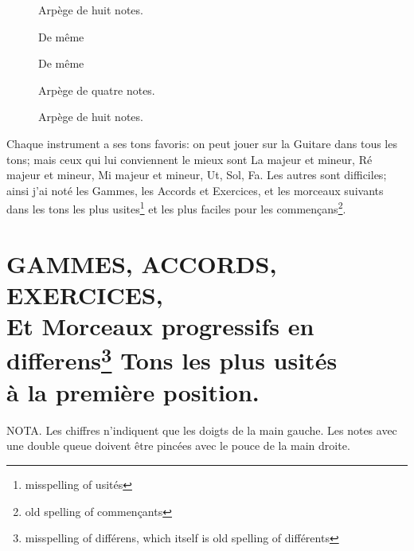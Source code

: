 \documentclass[a4paper]{book}
\begin{document}
\begin{figure}[H]
  \centering
  \begin{minipage}{1.8in}
    \caption{Arpège de huit notes.}
  \end{minipage}
  \hfill
  \begin{minipage}{1.9in}
    \caption{De même}
  \end{minipage}
  \hfill
  \begin{minipage}{2.1in}
    \caption{De même}
  \end{minipage}
\end{figure}

\begin{figure}[H]
  \centering
  \hfill
  \begin{minipage}{1.9in}
    \caption{Arpège de quatre notes.}
  \end{minipage}
  \hfill
  \begin{minipage}{2.1in}
    \caption{Arpège de huit notes.}
  \end{minipage}
  \hfill{}
\end{figure}

Chaque instrument a ses tons favoris: on peut jouer sur la Guitare dans tous les tons; mais ceux qui lui conviennent le mieux sont La majeur et mineur, Ré majeur et mineur, Mi majeur et mineur, Ut, Sol, Fa.  Les autres sont difficiles; ainsi j'ai noté les Gammes, les Accords et Exercices, et les morceaux suivants dans les tons les plus usites\footnote{misspelling of usités} et les plus faciles pour les commençans\footnote{old spelling of commençants}.

\chapter[Gammes, accords, exercices et morceaux progressifs en différens\\
tons les plus nécessaires]{%
  GAMMES, ACCORDS, EXERCICES,\\
  \Large Et Morceaux progressifs en differens\footnote{%
    misspelling of différens, which itself is old spelling of différents}
  Tons les plus usités\\
  à la première position.}

{\footnotesize NOTA\@.}
Les chiffres n'indiquent que les doigts de la main gauche.  Les notes avec une double queue doivent être pincées avec le pouce de la main droite.
\end{document}
